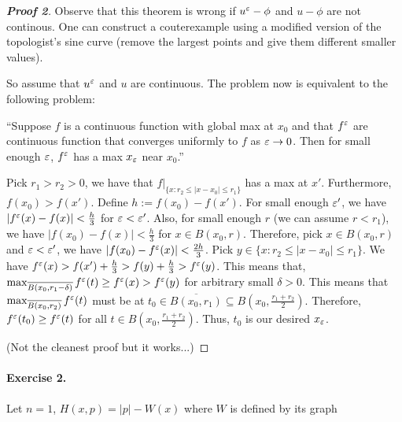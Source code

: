 \documentclass[12pt, oneside]{amsart}  	%
\begin{document}
\begin{proof}[\textbf{Proof 2}]
	Observe that this theorem is wrong if $u^\varepsilon -\phi$  and $u-\phi$ are not continous. One can construct a couterexample using a modified version of the topologist's sine curve (remove the largest points and give them different smaller values).

	So assume that $u^\varepsilon$ and $u$ are continuous. The problem now is equivalent to the following problem:

	``Suppose $f$ is a continuous function with global max at $x_0$ and that $f^\varepsilon$ are continuous function that converges uniformly to $f$ as $\varepsilon\to 0$. Then for small enough $\varepsilon$, $f^\varepsilon$ has a max $x_\varepsilon$ near $x_0$.''

	Pick $r_1>r_2>0$, we have that $f|_{\{x:r_2\le|x-x_0|\le r_1\}}$ has a max at $x'$. Furthermore, $f(x_0)>f(x')$. Define $h:=f(x_0)-f(x')$. For small enough $\varepsilon'$, we have $|f^\varepsilon(x)-f(x)|<\frac{h}{3}$ for $\varepsilon<\varepsilon'$. Also, for small enough $r$ (we can assume $r<r_1$), we have $|f(x_0)-f(x)|<\frac{h}{3}$ for $x\in B(x_0,r)$. Therefore, pick $x\in B(x_0,r)$ and $\varepsilon<\varepsilon'$, we have $|f(x_0)-f^\varepsilon(x)|<\frac{2h}{3}$. Pick $y\in\{x:r_2\le|x-x_0|\le r_1\}$. We have $f^\varepsilon(x)>f(x')+\frac{h}{3}>f(y)+\frac{h}{3}>f^\varepsilon(y)$. This means that, $\max_{\overline{B(x_0,r_1-\delta)}} f^\varepsilon(t) \ge f^\varepsilon(x)>f^\varepsilon(y)$ for arbitrary small $\delta>0$. This means that $\max_{\overline{B(x_0,r_2)}} f^\varepsilon(t)$ must be at $t_0\in\overline{B(x_0,r_1)}\subseteq B(x_0, \frac{r_1+r_2}{2})$. Therefore, $f^\varepsilon(t_0) \ge f^\varepsilon(t)$ for all $t\in B(x_0, \frac{r_1+r_2}{2})$. Thus, $t_0$ is our desired $x_\varepsilon$.

(Not the cleanest proof but it works...)
\end{proof}

\vspace*{0.2cm}



\paragraph{\textbf{Exercise 2.}} Let $n = 1$, $H(x,p) = |p| - W(x)$ where $W$ is defined by its graph
\end{document}
